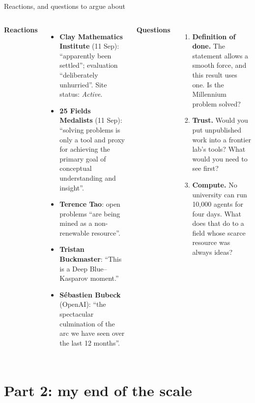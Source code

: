 \documentclass[aspectratio=169, 10pt]{beamer}
\newcommand{\q}[1]{``#1''}
\begin{document}
\begin{frame}{Reactions, and questions to argue about}
  \small
  \begin{columns}[t]
    \textbf{Reactions}
    \begin{itemize}
      \item \textbf{Clay Mathematics Institute} (11 Sep): \q{apparently been
        settled}; evaluation \q{deliberately unhurried}. Site status: \emph{Active}.
      \item \textbf{25 Fields Medalists} (11 Sep): \q{solving problems is only
        a tool and proxy for achieving the primary goal of conceptual
        understanding and insight}.
      \item \textbf{Terence Tao}: open problems \q{are being mined as a
        non-renewable resource}.
      \item \textbf{Tristan Buckmaster}: \q{This is a Deep Blue--Kasparov
        moment.}
      \item \textbf{Sébastien Bubeck} (OpenAI): \q{the spectacular culmination
        of the arc we have seen over the last 12 months}.
    \end{itemize}
    \textbf{Questions}
    \begin{enumerate}
      \item \textbf{Definition of done.} The statement allows a smooth force,
        and this result uses one. Is the Millennium problem solved?
      \item \textbf{Trust.} Would you put unpublished work into a frontier
        lab's tools? What would you need to see first?
      \item \textbf{Compute.} No university can run 10,000 agents for four
        days. What does that do to a field whose scarce resource was always
        ideas?
    \end{enumerate}
  \end{columns}
\end{frame}

\section{Part 2: my end of the scale}
\end{document}
